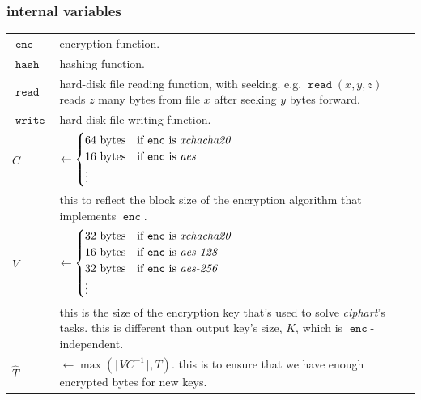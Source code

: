 \documentclass[twocolumn]{article}
\DeclareMathOperator{\fread}{\mathtt{read}}
\DeclareMathOperator{\fwrite}{\mathtt{write}}
\DeclareMathOperator{\enc}{\mathtt{enc}}
\DeclareMathOperator{\maxf}{max}
\DeclareMathOperator{\hash}{\mathtt{hash}}
\begin{document}
\subsubsection{internal variables}
\begin{tabularx}{\columnwidth}{lX}
    $\enc$      & encryption function.\\
    $\hash$     & hashing function.\\
    $\fread$    & hard-disk file reading function, with seeking.  e.g.
                    $\fread(x, y, z)$ reads $z$ many bytes from file $x$
                    after seeking $y$ bytes forward.\\
    $\fwrite$   & hard-disk file writing function.\\
    $C$         & $\gets \begin{cases}
                        64 \text{ bytes} & \text{if $\enc$ is
                                            \emph{xchacha20}}\\
                        16 \text{ bytes} & \text{if $\enc$ is \emph{aes}}\\
                        \vdots & \\
                     \end{cases}$\\
                & this to reflect the block size of the encryption
                    algorithm that implements $\enc$.\\
    $V$ & $\gets \begin{cases}
                        32 \text{ bytes} & \text{if $\enc$ is
                                            \emph{xchacha20}}\\
                        16 \text{ bytes} & \text{if $\enc$ is
                            \emph{aes-128}}\\
                        32 \text{ bytes} & \text{if $\enc$ is
                            \emph{aes-256}}\\
                        \vdots & \\
                     \end{cases}$\\
                & this is the size of the encryption key that's used to
                    solve \emph{ciphart}'s tasks.  this is different than
                    output key's size, $K$, which is $\enc$-independent.\\
    $\hat T$    & $\gets \maxf(\lceil V C^{-1}\rceil, T)$.  this
                    is to ensure that we have enough encrypted bytes for
                    new keys.\\
\end{tabularx}
\end{document}
